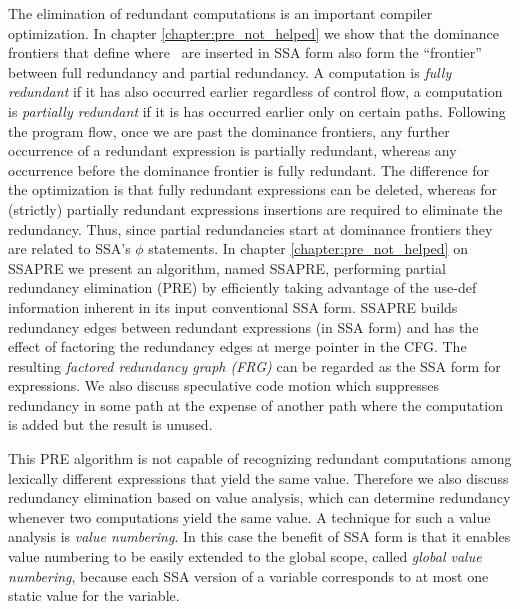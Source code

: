 The elimination of redundant computations is an important compiler
optimization. In chapter \ref{chapter:pre_not_helped} we show that the
dominance frontiers that define where \phifuns\ are inserted
in SSA form also form the ``frontier'' between full redundancy and
partial redundancy. A computation is {\em fully redundant} if it has
also occurred earlier regardless of control flow, a computation is {\em
  partially redundant} if it is has occurred earlier only on certain
paths. Following the program flow, once we are past the dominance
frontiers, any further occurrence of a redundant expression is
partially redundant, whereas any occurrence before the dominance
frontier is fully redundant. The difference for the optimization is
that fully redundant expressions can be deleted, whereas for
(strictly) partially redundant expressions insertions are required to
eliminate the redundancy. Thus, since partial redundancies start at
dominance frontiers they are related to SSA's $\phi$ statements. In
chapter \ref{chapter:pre_not_helped} on SSAPRE we present an
algorithm, named SSAPRE, performing partial redundancy elimination
(PRE) by efficiently taking advantage of the use-def information
inherent in its input conventional SSA form. SSAPRE builds redundancy
edges between redundant expressions (in SSA form) and has the effect
of factoring the redundancy edges at merge pointer in the CFG. The
resulting {\em factored redundancy graph (FRG)} can be regarded as the
SSA form for expressions. We also discuss speculative code motion
which suppresses redundancy in some path at the expense of another
path where the computation is added but the result is unused.

This PRE algorithm is not capable of recognizing redundant
computations among lexically different expressions that yield the same
value. Therefore we also discuss redundancy elimination based on value
analysis, which can determine redundancy whenever two computations
yield the same value. A technique for such a value analysis is {\em
  value numbering}. In this case the benefit of SSA form is that it
enables value numbering to be easily extended to the global scope,
called {\em global value numbering}, because each SSA version of a
variable corresponds to at most one static value for the variable.

